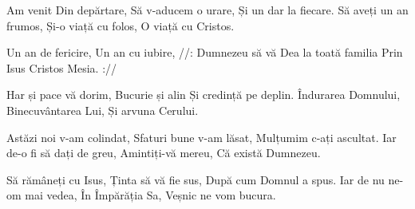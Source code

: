 
\beginverse
Am venit
Din depărtare,
Să v-aducem o urare,
Și un dar la fiecare.
Să aveți un an frumos,
Și-o viață cu folos,
O viață cu Cristos.
\endverse

\beginchorus
Un an de fericire,
Un an cu iubire,
//: Dumnezeu să vă
Dea la toată familia
Prin Isus Cristos
Mesia. ://
\endchorus

\beginverse
Har și pace vă dorim,
Bucurie și alin
Și credință pe deplin.
Îndurarea Domnului,
Binecuvântarea Lui,
Și arvuna Cerului.
\endverse

\beginverse
Astăzi noi v-am colindat,
Sfaturi bune v-am lăsat,
Mulțumim c-ați ascultat.
Iar de-o fi să dați de greu,
Amintiți-vă mereu,
Că există Dumnezeu.
\endverse

\beginverse
Să rămâneți cu Isus,
Ținta să vă fie sus,
După cum Domnul a spus.
Iar de nu ne-om mai vedea,
În Împărăția Sa,
Veșnic ne vom bucura.
\endverse

\endsong